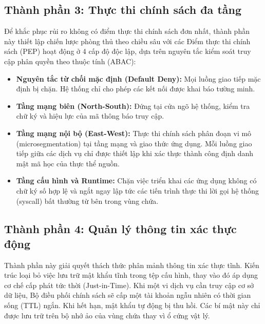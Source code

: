 \subsection{Thành phần 3: Thực thi chính sách đa tầng}
Để khắc phục rủi ro không có điểm thực thi chính sách đơn nhất, thành phần này thiết lập chiến lược phòng thủ theo chiều sâu với các Điểm thực thi chính sách (PEP) hoạt động ở 4 cấp độ độc lập, dựa trên nguyên tắc kiểm soát truy cập phân quyền theo thuộc tính (ABAC):
\begin{itemize}[itemsep=6pt, parsep=0pt]
    \item \textbf{Nguyên tắc từ chối mặc định (Default Deny):} Mọi luồng giao tiếp mặc định bị chặn. Hệ thống chỉ cho phép các kết nối được khai báo tường minh.
    \item \textbf{Tầng mạng biên (North-South):} Đứng tại cửa ngõ hệ thống, kiểm tra chữ ký và hiệu lực của mã thông báo truy cập.
    \item \textbf{Tầng mạng nội bộ (East-West):} Thực thi chính sách phân đoạn vi mô (microsegmentation) tại tầng mạng và giao thức ứng dụng. Mỗi luồng giao tiếp giữa các dịch vụ chỉ được thiết lập khi xác thực thành công định danh mật mã học của thực thể nguồn.
    \item \textbf{Tầng cấu hình và Runtime:} Chặn việc triển khai các ứng dụng không có chữ ký số hợp lệ và ngắt ngay lập tức các tiến trình thực thi lời gọi hệ thống (syscall) bất thường từ bên trong vùng chứa.
\end{itemize}

\subsection{Thành phần 4: Quản lý thông tin xác thực động}
Thành phần này giải quyết thách thức phân mảnh thông tin xác thực tĩnh. Kiến trúc loại bỏ việc lưu trữ mật khẩu tĩnh trong tệp cấu hình, thay vào đó áp dụng cơ chế cấp phát tức thời (Just-in-Time). Khi một vi dịch vụ cần truy cập cơ sở dữ liệu, Bộ điều phối chính sách sẽ cấp một tài khoản ngẫu nhiên có thời gian sống (TTL) ngắn. Khi hết hạn, mật khẩu tự động bị thu hồi. Các bí mật này chỉ được lưu trữ trên bộ nhớ ảo của vùng chứa thay vì ổ cứng vật lý.

